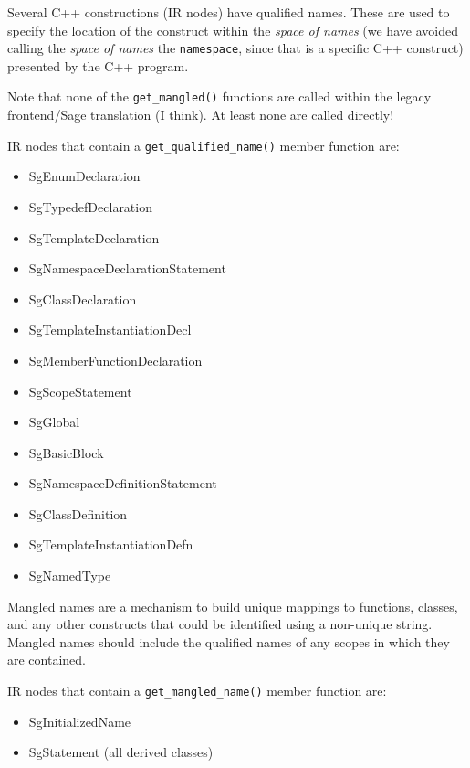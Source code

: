      Several C++ constructions (IR nodes) have qualified names.  These
are used to specify the location of the construct within the {\em space of names}
(we have avoided calling the {\em space of names} the {\tt namespace}, since that
is a specific C++ construct) presented by the C++ program.

     Note that none of the {\tt get\_mangled()} functions are called within the legacy frontend/Sage 
translation (I think).  At least none are called directly!

   IR nodes that contain a {\tt get\_qualified\_name()} member function are:
\begin{itemize}
     \item SgEnumDeclaration
     \item SgTypedefDeclaration
     \item SgTemplateDeclaration
     \item SgNamespaceDeclarationStatement
     \item SgClassDeclaration
     \item SgTemplateInstantiationDecl
     \item SgMemberFunctionDeclaration
     \item SgScopeStatement
     \item SgGlobal
     \item SgBasicBlock
     \item SgNamespaceDefinitionStatement
     \item SgClassDefinition
     \item SgTemplateInstantiationDefn
     \item SgNamedType
\end{itemize}

   Mangled names are a mechanism to build unique mappings to functions, classes,
and any other constructs that could be identified using a non-unique string.
Mangled names should include the qualified names of any scopes in which they
are contained.

   IR nodes that contain a {\tt get\_mangled\_name()} member function are:
\begin{itemize}
     \item SgInitializedName
     \item SgStatement (all derived classes)
\end{itemize}


